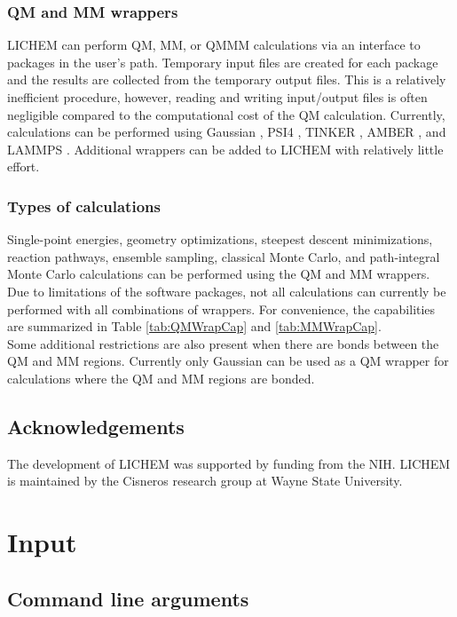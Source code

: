 \documentclass[12pt]{report}
\begin{document}
\subsection{QM and MM wrappers}

LICHEM can perform QM, MM, or QMMM calculations via an interface to packages
in the user's path. Temporary input files are created for each package and
the results are collected from the temporary output files. This is a
relatively inefficient procedure, however, reading and writing input/output
files is often negligible compared to the computational cost of the QM
calculation. Currently, calculations can be performed using Gaussian
\cite{Frisch2009}, PSI4 \cite{Turney2012}, TINKER \cite{}, AMBER \cite{}, and
LAMMPS \cite{Plimpton1995}. Additional wrappers can be added to LICHEM with
relatively little effort.

\subsection{Types of calculations}

Single-point energies, geometry optimizations, steepest descent minimizations,
reaction pathways, ensemble sampling, classical Monte Carlo, and
path-integral Monte Carlo calculations can be performed using the QM and MM
wrappers. Due to limitations of the software packages, not all calculations
can currently be performed with all combinations of wrappers. For convenience,
the capabilities are summarized in Table \ref{tab:QMWrapCap} and
\ref{tab:MMWrapCap}. \\

Some additional restrictions are also present when there are bonds between
the QM and MM regions. Currently only Gaussian can be used as a QM wrapper
for calculations where the QM and MM regions are bonded.

\section{Acknowledgements}

The development of LICHEM was supported by funding from the NIH. LICHEM is
maintained by the Cisneros research group at Wayne State University.

\chapter{Input}

\section{Command line arguments}
\end{document}
